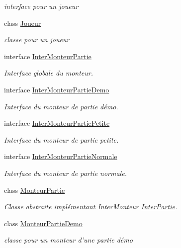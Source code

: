 \begin{DoxyCompactItemize}
\begin{DoxyCompactList}\small\item\em interface pour un joueur \end{DoxyCompactList}\item 
class \hyperlink{class_small_world_1_1_joueur}{Joueur}
\begin{DoxyCompactList}\small\item\em classe pour un joueur \end{DoxyCompactList}\item 
interface \hyperlink{interface_small_world_1_1_inter_monteur_partie}{Inter\-Monteur\-Partie}
\begin{DoxyCompactList}\small\item\em Interface globale du monteur. \end{DoxyCompactList}\item 
interface \hyperlink{interface_small_world_1_1_inter_monteur_partie_demo}{Inter\-Monteur\-Partie\-Demo}
\begin{DoxyCompactList}\small\item\em Interface du monteur de partie démo. \end{DoxyCompactList}\item 
interface \hyperlink{interface_small_world_1_1_inter_monteur_partie_petite}{Inter\-Monteur\-Partie\-Petite}
\begin{DoxyCompactList}\small\item\em Interface du monteur de partie petite. \end{DoxyCompactList}\item 
interface \hyperlink{interface_small_world_1_1_inter_monteur_partie_normale}{Inter\-Monteur\-Partie\-Normale}
\begin{DoxyCompactList}\small\item\em Interface du monteur de partie normale. \end{DoxyCompactList}\item 
class \hyperlink{class_small_world_1_1_monteur_partie}{Monteur\-Partie}
\begin{DoxyCompactList}\small\item\em Classe abstraite implémentant Inter\-Monteur \hyperlink{interface_small_world_1_1_inter_partie}{Inter\-Partie}. \end{DoxyCompactList}\item 
class \hyperlink{class_small_world_1_1_monteur_partie_demo}{Monteur\-Partie\-Demo}
\begin{DoxyCompactList}\small\item\em classe pour un monteur d'une partie démo \end{DoxyCompactList}\item 

\end{DoxyCompactItemize}
